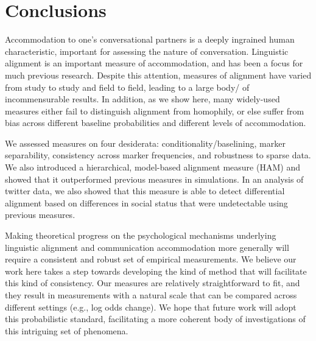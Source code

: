 \documentclass{acm_proc_article-sp}
\begin{document}
\section{Conclusions}

Accommodation to one's conversational partners is a deeply ingrained human characteristic, important for assessing the nature of conversation. Linguistic alignment is an important measure of accommodation, and has been a focus for much previous research. Despite this attention, measures of alignment have varied from study to study and field to field, leading to a large body/ of incommensurable results. In addition, as we show here, many widely-used measures either fail to distinguish alignment from homophily, or else suffer from bias across different baseline probabilities and different levels of accommodation. 

We assessed measures on four desiderata: conditionality/baselining, marker separability, consistency across marker frequencies, and robustness to sparse data.  We also introduced a hierarchical, model-based alignment measure (HAM) and showed that it outperformed previous measures in simulations. In an analysis of twitter data, we also showed that this measure is able to detect differential alignment based on differences in social status that were undetectable using previous measures. 

Making theoretical progress on the psychological mechanisms underlying linguistic alignment and communication accommodation more generally will require a consistent and robust set of empirical measurements. We believe our work here takes a step towards developing the kind of method that will facilitate this kind of consistency. Our measures are relatively straightforward to fit, and they result in measurements with a natural scale that can be compared across different settings (e.g., log odds change). We hope that future work will adopt this probabilistic standard, facilitating a more coherent body of investigations of this intriguing set of phenomena. 




%
\clearpage

%
%
\balancecolumns
\end{document}
